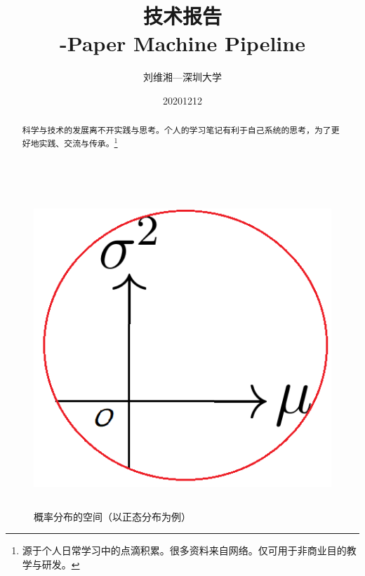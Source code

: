 \documentclass[UTF8,12pt]{ctexart}
\begin{document}
\title{技术报告\\-Paper Machine Pipeline}%
\author{刘维湘---深圳大学}%

\date{20201212}%

\maketitle
\begin{abstract}
科学与技术的发展离不开实践与思考。个人的学习笔记有利于自己系统的思考，为了更好地实践、交流与传承。\footnote{源于个人日常学习中的点滴积累。很多资料来自网络。仅可用于非商业目的教学与研发。}

\end{abstract}

\newpage
\begin{figure}[h!]
\begin{center}
\includegraphics[width=12cm,height=12cm]{mu_sigma.png}%
\end{center}
\caption*{概率分布的空间（以正态分布为例）}\label{NLP}
\end{figure}


\newpage
\tableofcontents
\end{document}
